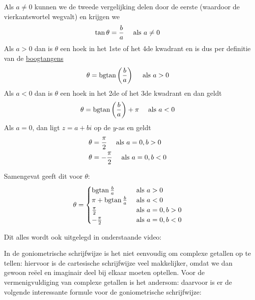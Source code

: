 \documentclass{ximera}
\begin{document}
\begin{remark}\nl
	
	Als $a \neq 0$ kunnen we de tweede vergelijking delen door de eerste (waardoor de vierkantswortel wegvalt) en krijgen we
	$$ 
	\tan \theta = \frac{b}{a}  \quad \text{ als } a \neq 0
	$$ 
	Als $a >0$ dan is $\theta$ een hoek in het 1ste of het 4de kwadrant en is dus per definitie van de \hyperref[xim:cyclometrische_functies]{boogtangens }
	$$
	\theta  =  \operatorname{bgtan} \left(\frac{b}{a}\right) \quad \text{ als }  a>0
	$$
	Als $a<0$ dan is $\theta$ een hoek in het 2de of het 3de kwadrant en dan geldt
	$$
	\theta  =  \operatorname{bgtan} \left(\frac{b}{a}\right) + \pi \quad \text{ als }  a<0
	$$
	Als $a=0$, dan ligt $z=a+bi$ op de $y$-as en geldt
	\begin{align*}
	\theta & =  \frac{\pi}{2}  \quad\text{ als } a=0, b > 0\\
	\theta & = -\frac{\pi}{2} \quad\text{ als } a=0, b < 0
	\end{align*}
	
	Samengevat geeft dit voor $\theta$:
	$$
	\theta = \begin{cases}
	\bgtan \frac{b}{a}       & \Tals a>0        \\
	\pi + \bgtan \frac{b}{a} & \Tals a<0        \\   %
	\frac{\pi}{2}            & \Tals a=0, b > 0 \\
	-\frac{\pi}{2}           & \Tals a=0, b < 0
	\end{cases}
	$$
	\begin{basicSkip}
Dit alles wordt ook uitgelegd in onderstaande video:

\end{basicSkip}

\end{remark}



\nl

In de goniometrische schrijfwijze is het niet eenvoudig om complexe getallen op te tellen: hiervoor is de cartesische schrijfwijze veel makkelijker, omdat we dan gewoon reëel en imaginair deel bij elkaar moeten optellen. Voor de vermenigvuldiging van complexe getallen is het andersom: daarvoor is er de volgende interessante formule voor de goniometrische schrijfwijze: 
\end{document}
